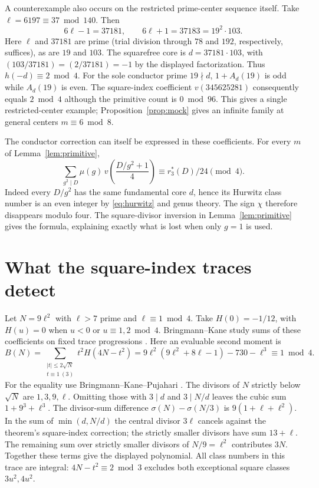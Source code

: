 \documentclass[11pt]{article}
\begin{document}
A counterexample also occurs on the restricted prime-center sequence
itself. Take $\ell=6197\equiv37\bmod140$. Then
\[
 6\ell-1=37181,\qquad 6\ell+1=37183=19^2\cdot103 .
\]
Here $\ell$ and $37181$ are prime (trial division through $78$ and
$192$, respectively, suffices), as are $19$ and $103$. The squarefree
core is $d=37181\cdot103$, with $(103/37181)=(2/37181)=-1$ by the
displayed factorization. Thus $h(-d)\equiv2\bmod4$. For the sole
conductor prime $19\nmid d$, $1+A_d(19)$ is odd while $A_d(19)$ is
even. The square-index coefficient $v(345625281)$ consequently equals
$2\bmod4$ although the primitive count is $0\bmod96$. This gives
a single restricted-center example; Proposition~\ref{prop:mock}
gives an infinite family at general centers $m\equiv6\bmod8$.

The conductor correction can itself be expressed in these coefficients.
For every $m$ of Lemma~\ref{lem:primitive},
\[
   \sum_{g^2\mid D}\mu(g)\,
        v\!\left(\frac{D/g^2+1}{4}\right)
         \equiv r_3^*(D)/24\pmod4 .
\]
Indeed every $D/g^2$ has the same fundamental core $d$, hence its
Hurwitz class number is an even integer by \eqref{eq:hurwitz} and genus
theory. The sign $\chi$ therefore disappears modulo four. The
square-divisor inversion in Lemma~\ref{lem:primitive} gives the
formula, explaining exactly what is lost when only $g=1$ is used.

\section{What the square-index traces detect}
Let $N=9\ell^2$ with $\ell>7$ prime and $\ell\equiv1\bmod4$.
Take $H(0)=-1/12$, with $H(u)=0$ when $u<0$ or $u\equiv1,2\bmod4$.
Bringmann--Kane study sums of these coefficients on
fixed trace progressions \cite[Theorem 1.4]{bk}. Here an evaluable
second moment is
\[
 B(N)=\sum_{\substack{|t|\le2\sqrt N\\t\equiv1\ (3)}}t^2H(4N-t^2)
   =9\ell^2(9\ell^2+8\ell-1)-730-\ell^3
   \equiv1\bmod4 .
\]
For the equality use Bringmann--Kane--Pujahari
\cite[Theorem 1.1(2), nonzero residue class]{bkp}. The divisors of
$N$ strictly below $\sqrt N$ are $1,3,9,\ell$. Omitting those with
$3\mid d$ and $3\mid N/d$ leaves the cubic sum $1+9^3+\ell^3$.
The divisor-sum difference $\sigma(N)-\sigma(N/3)$ is
$9(1+\ell+\ell^2)$. In the sum of $\min(d,N/d)$ the central divisor
$3\ell$ cancels against the theorem's square-index correction; the
strictly smaller divisors have sum $13+\ell$. The remaining sum over
strictly smaller divisors of $N/9=\ell^2$ contributes $3N$.
Together these terms give the displayed polynomial. All class numbers
in this trace are integral: $4N-t^2\equiv2\bmod3$ excludes both
exceptional square classes $3u^2,4u^2$.
\end{document}
